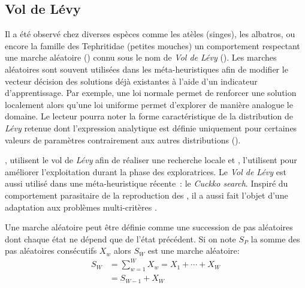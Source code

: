 \subsection{Vol de Lévy} %
\label{sub:vol_de_levy}
Il a été observé chez diverses espèces comme les atèles (singes), les albatros,
ou encore la famille des Tephritidae (petites mouches) un comportement respectant
une marche aléatoire () connu sous le nom de
\textit{Vol de Lévy} ().
Les marches aléatoires sont souvent utilisées dans les méta-heuristiques afin de modifier
le vecteur décision des solutions déjà existantes à l’aide d’un indicateur d’apprentissage.
Par exemple, une loi normale permet de renforcer une solution localement alors qu’une loi
uniforme permet d’explorer de manière analogue le domaine. Le lecteur pourra noter la
forme caractéristique de la distribution de \textit{Lévy} retenue dont l’expression
analytique est définie uniquement pour certaines valeurs de paramètres contrairement aux autres
distributions ().

\textcite{Sharma2012213}, utilisent le vol de \textit{Lévy} afin de réaliser une recherche locale
et \textcite{Hakli2013254}, l’utilisent pour améliorer l’exploitation durant la phase des
exploratrices. Le \textit{Vol de Lévy} est aussi utilisé dans une méta-heuristique
récente~: le \textit{Cuckko search}. Inspiré du comportement parasitaire de la
reproduction des , il a aussi
fait l’objet d’une adaptation aux problèmes multi-critères \parencite{Yang20131616}.

\begin{Def}\label{def:marche_aleatoire}
Une marche aléatoire \parencite{Yang201445} peut être définie comme une succession de pas
aléatoires dont chaque état ne dépend que de l’état précédent. Si on note $S_{P}$
la somme des pas aléatoires consécutifs $X_{w}$ alors $S_{W}$ est une marche aléatoire:
\begin{equation}\label{eq:marche_aleatoire}
    \begin{split}
        S_{W} &= \sum_{w=1}^{W} X_{w} = X_{1} + \dotsb + X_{W}\\
              &= S_{W-1} + X_{W}
    \end{split}
\end{equation}
\end{Def}

